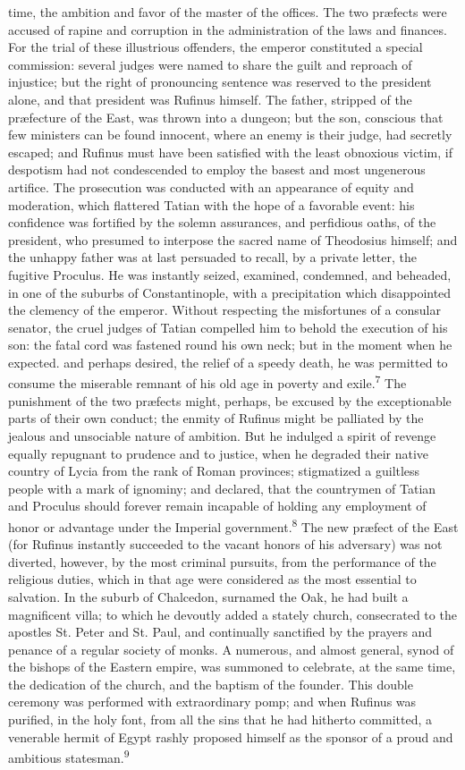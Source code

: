 time, the ambition and favor of the master of the offices. The
two præfects were accused of rapine and corruption in the
administration of the laws and finances. For the trial of these
illustrious offenders, the emperor constituted a special
commission: several judges were named to share the guilt and
reproach of injustice; but the right of pronouncing sentence was
reserved to the president alone, and that president was Rufinus
himself. The father, stripped of the præfecture of the East, was
thrown into a dungeon; but the son, conscious that few ministers
can be found innocent, where an enemy is their judge, had
secretly escaped; and Rufinus must have been satisfied with the
least obnoxious victim, if despotism had not condescended to
employ the basest and most ungenerous artifice. The prosecution
was conducted with an appearance of equity and moderation, which
flattered Tatian with the hope of a favorable event: his
confidence was fortified by the solemn assurances, and perfidious
oaths, of the president, who presumed to interpose the sacred
name of Theodosius himself; and the unhappy father was at last
persuaded to recall, by a private letter, the fugitive Proculus.
He was instantly seized, examined, condemned, and beheaded, in
one of the suburbs of Constantinople, with a precipitation which
disappointed the clemency of the emperor. Without respecting the
misfortunes of a consular senator, the cruel judges of Tatian
compelled him to behold the execution of his son: the fatal cord
was fastened round his own neck; but in the moment when he
expected. and perhaps desired, the relief of a speedy death, he
was permitted to consume the miserable remnant of his old age in
poverty and exile.\textsuperscript{7} The punishment of the two præfects might,
perhaps, be excused by the exceptionable parts of their own
conduct; the enmity of Rufinus might be palliated by the jealous
and unsociable nature of ambition. But he indulged a spirit of
revenge equally repugnant to prudence and to justice, when he
degraded their native country of Lycia from the rank of Roman
provinces; stigmatized a guiltless people with a mark of
ignominy; and declared, that the countrymen of Tatian and
Proculus should forever remain incapable of holding any
employment of honor or advantage under the Imperial government.\textsuperscript{8}
The new præfect of the East (for Rufinus instantly succeeded to
the vacant honors of his adversary) was not diverted, however, by
the most criminal pursuits, from the performance of the religious
duties, which in that age were considered as the most essential
to salvation. In the suburb of Chalcedon, surnamed the Oak, he
had built a magnificent villa; to which he devoutly added a
stately church, consecrated to the apostles St. Peter and St.
Paul, and continually sanctified by the prayers and penance of a
regular society of monks. A numerous, and almost general, synod
of the bishops of the Eastern empire, was summoned to celebrate,
at the same time, the dedication of the church, and the baptism
of the founder. This double ceremony was performed with
extraordinary pomp; and when Rufinus was purified, in the holy
font, from all the sins that he had hitherto committed, a
venerable hermit of Egypt rashly proposed himself as the sponsor
of a proud and ambitious statesman.\textsuperscript{9}

